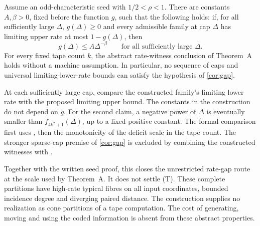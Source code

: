 \begin{corollary}\label{cor:abstract-gap}
Assume an odd-characteristic seed with $1/2<\rho<1$.
There are constants $A,\beta>0$, fixed before the function $g$, such
that the following holds: if, for all sufficiently large $\Delta$,
$g(\Delta)\ge0$ and every admissible family at cap $\Delta$ has
limiting upper rate at most $1-g(\Delta)$, then
\[
 g(\Delta)\le A\Delta^{-\beta}
 \qquad\text{for all sufficiently large }\Delta.
\]
For every fixed tape count $k$, the abstract rate-witness conclusion
of Theorem~A holds without a machine assumption. In particular, no
sequence of caps and universal limiting-lower-rate bounds can satisfy
the hypothesis of \cref{cor:gap}.
\end{corollary}
\begin{outline}
At each sufficiently large cap, compare the constructed family's
limiting lower rate with the proposed limiting upper bound. The
constants in the construction do not depend on $g$. For the second
claim, a negative power of $\Delta$ is eventually smaller than
$f_{4k^2+1}(\Delta)$, up to a fixed positive constant. The formal
comparison first uses
, then the
monotonicity of the deficit scale in the tape count.
The stronger sparse-cap premise of \cref{cor:gap} is excluded by
combining the constructed witnesses with
.
\end{outline}

Together with the written seed proof, this closes the unrestricted
rate-gap route at the scale used by Theorem~A. It does not settle (T).
These complete partitions have high-rate typical fibres on all input
coordinates, bounded incidence degree and diverging paired distance.
The construction supplies no realization as cone partitions of a tape
computation. The cost of generating, moving and using the coded
information is absent from these abstract properties.
